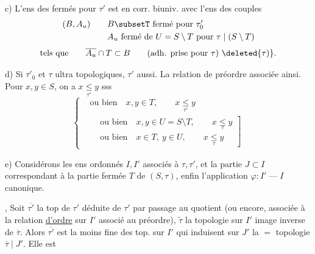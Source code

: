 c) L'ens des fermés pour $\tau'$ est en corr. biuniv. avec l'ens des couples
\[
\begin{aligned}
(B,A_{u}) \qquad & B\subsetT\ \text{fermé pour }\tau'_0\\
& A_u\ \text{fermé de }U=S\setminus T\ \text{pour }\tau\mid(S\setminus T)
\end{aligned}
\]
\[
\text{tels que}\qquad \overline{A_u}\cap T\subset B \qquad
\text{(adh. prise pour }\tau\text{)}\ \deleted{\tau)}.
\]

d) Si $\tau'_0$ et $\tau$ ultra topologiques, $\tau'$ aussi. La relation de préordre associée   ainsi. Pour $x,y\in S$, on a $x\underset{\tau'}{\leq}y$ sss
\[
\left\{\begin{aligned}
&\text{ou bien}\quad x,y\in T,\qquad x\underset{\tau'}{\leq}y\\
&\left.\begin{aligned}
&\text{ou bien}\quad x,y\in U=S\setminus T,\qquad x\underset{\tau}{\leq}y\\
&\text{ou bien}\quad x\in T,\ y\in U,\qquad x\underset{\tau}{\leq}y
\end{aligned}\right]
\end{aligned}\right.
\]

e)  Considérons les ens ordonnés $I,I'$ associés à $\tau,\tau'$, et la partie  $J\subset I$ correspondant à la partie fermée $T$ de $(S,\tau)$, enfin l'application $\varphi:I'\mathbin{\text{---}}I$ canonique.

,  Soit $\overline{\tau'}$  la top de $\tau'$ déduite de $\tau'$ par passage au quotient (ou encore, associée à la relation \uline{d'ordre} sur $I'$ associé au préordre), $\widetilde{\tau}$ la topologie sur $I'$ image inverse de $\overline{\tau}$. Alors $\overline{\tau'}$ est la moins fine des top. sur $I'$ qui  induisent sur $J'$ la $=$  topologie $\overline{\tau}\mid J'$. Elle est
